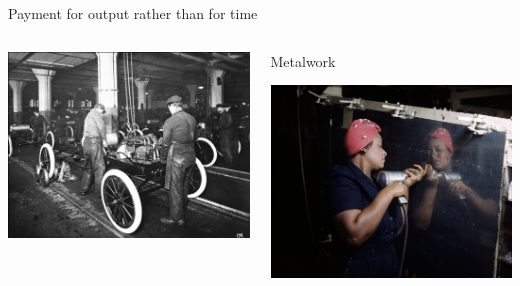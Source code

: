 \documentclass[presentation]{subfiles}
\begin{document}
\begin{frame}[t]{Payment for output rather than for time}
\begin{columns}[T]
\begin{column}{0.33\textwidth}
      \includegraphics[max width=\linewidth,max height=.3\textheight,keepaspectratio]{../common_figures/photo/ford_assembly_line.jpg}
    \end{column}
    \begin{column}{0.33\textwidth}
      \centering
      Metalwork

      \vspace{0.5em}

      \includegraphics[max width=\linewidth,max height=.3\textheight,keepaspectratio]{../common_figures/photo/Rosie_the_Riveter_(Vultee)_DS.jpg}
    \end{column}
  \end{columns}
  \vspace*{7mm}
  

\end{frame}
\end{document}
